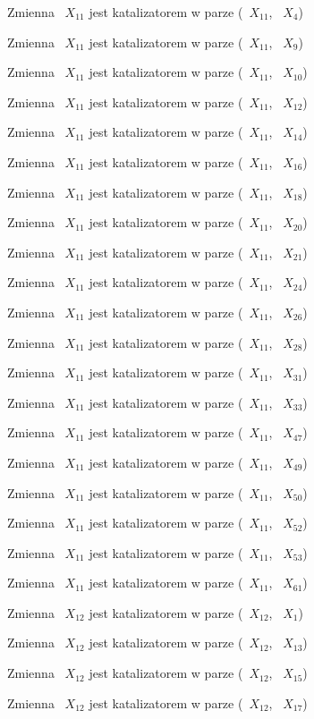 \documentclass{article}
\begin{document}
Zmienna ~$X_{11}$ jest katalizatorem w parze (~$X_{11}$, ~$X_{4}$)

Zmienna ~$X_{11}$ jest katalizatorem w parze (~$X_{11}$, ~$X_{9}$)

Zmienna ~$X_{11}$ jest katalizatorem w parze (~$X_{11}$, ~$X_{10}$)

Zmienna ~$X_{11}$ jest katalizatorem w parze (~$X_{11}$, ~$X_{12}$)

Zmienna ~$X_{11}$ jest katalizatorem w parze (~$X_{11}$, ~$X_{14}$)

Zmienna ~$X_{11}$ jest katalizatorem w parze (~$X_{11}$, ~$X_{16}$)

Zmienna ~$X_{11}$ jest katalizatorem w parze (~$X_{11}$, ~$X_{18}$)

Zmienna ~$X_{11}$ jest katalizatorem w parze (~$X_{11}$, ~$X_{20}$)

Zmienna ~$X_{11}$ jest katalizatorem w parze (~$X_{11}$, ~$X_{21}$)

Zmienna ~$X_{11}$ jest katalizatorem w parze (~$X_{11}$, ~$X_{24}$)

Zmienna ~$X_{11}$ jest katalizatorem w parze (~$X_{11}$, ~$X_{26}$)

Zmienna ~$X_{11}$ jest katalizatorem w parze (~$X_{11}$, ~$X_{28}$)

Zmienna ~$X_{11}$ jest katalizatorem w parze (~$X_{11}$, ~$X_{31}$)

Zmienna ~$X_{11}$ jest katalizatorem w parze (~$X_{11}$, ~$X_{33}$)

Zmienna ~$X_{11}$ jest katalizatorem w parze (~$X_{11}$, ~$X_{47}$)

Zmienna ~$X_{11}$ jest katalizatorem w parze (~$X_{11}$, ~$X_{49}$)

Zmienna ~$X_{11}$ jest katalizatorem w parze (~$X_{11}$, ~$X_{50}$)

Zmienna ~$X_{11}$ jest katalizatorem w parze (~$X_{11}$, ~$X_{52}$)

Zmienna ~$X_{11}$ jest katalizatorem w parze (~$X_{11}$, ~$X_{53}$)

Zmienna ~$X_{11}$ jest katalizatorem w parze (~$X_{11}$, ~$X_{61}$)

Zmienna ~$X_{12}$ jest katalizatorem w parze (~$X_{12}$, ~$X_{1}$)

Zmienna ~$X_{12}$ jest katalizatorem w parze (~$X_{12}$, ~$X_{13}$)

Zmienna ~$X_{12}$ jest katalizatorem w parze (~$X_{12}$, ~$X_{15}$)

Zmienna ~$X_{12}$ jest katalizatorem w parze (~$X_{12}$, ~$X_{17}$)
\end{document}
